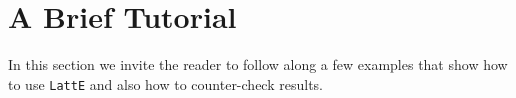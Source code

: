 \documentclass{article}
\begin{document}

\section{A Brief Tutorial}
In this section we invite the reader to follow along a few examples
that show how to use {\tt LattE} and also how to counter-check
results.
\end{document}
